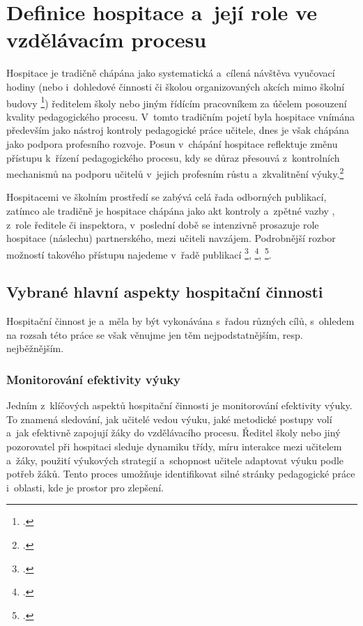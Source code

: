 \setcounter{page}{1}

\section{Definice hospitace a~její role ve vzdělávacím procesu}

Hospitace je tradičně chápána jako systematická a~cílená návštěva vyučovací hodiny (nebo i~dohledové činnosti či školou organizovaných akcích mimo školní budovy \footcite[14]{hospitace-funkce}) ředitelem školy nebo jiným řídícím pracovníkem za účelem posouzení kvality pedagogického procesu. V~tomto tradičním pojetí byla hospitace vnímána především jako nástroj kontroly pedagogické práce učitele, dnes je však chápána jako podpora profesního rozvoje. Posun v~chápání hospitace reflektuje změnu přístupu k~řízení pedagogického procesu, kdy se důraz přesouvá z~kontrolních mechanismů na podporu učitelů v~jejich profesním růstu a~zkvalitnění výuky.\footcite[139]{ped-proces-rizeni}

Hospitacemi ve školním prostředí se zabývá celá řada odborných publikací, zatímco ale tradičně je hospitace chápána jako akt kontroly a~zpětné vazby , z~role ředitele či inspektora, v~poslední době se intenzivně prosazuje  role hospitace (náslechu) partnerského, mezi učiteli navzájem. Podrobnější rozbor možností takového přístupu najedeme v~řadě publikací \footcite{ucime-ucit-se}, \footcite{metody-a-formy}, \footcite{rozvijejici-hospitace}. 

\subsection{Vybrané hlavní aspekty hospitační činnosti}

Hospitační činnost je a~měla by být vykonávána s~řadou různých cílů, s~ohledem na rozsah této práce se však věnujme jen těm nejpodstatnějším, resp. nejběžnějším.

\subsubsection{Monitorování efektivity výuky}

Jedním z~klíčových aspektů hospitační činnosti je monitorování efektivity výuky. To znamená sledování, jak učitelé vedou výuku, jaké metodické postupy volí a~jak efektivně zapojují žáky do vzdělávacího procesu. Ředitel školy nebo jiný pozorovatel při hospitaci sleduje dynamiku třídy, míru interakce mezi učitelem a~žáky, použití výukových strategií a~schopnost učitele adaptovat výuku podle potřeb žáků. Tento proces umožňuje identifikovat silné stránky pedagogické práce i~oblasti, kde je prostor pro zlepšení.

